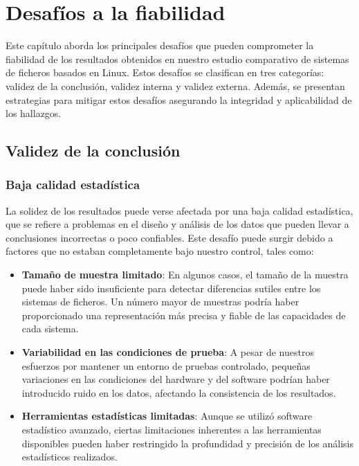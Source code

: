 \chapter{Desafíos a la fiabilidad}

Este capítulo aborda los principales desafíos que pueden comprometer la fiabilidad de los resultados obtenidos en nuestro estudio comparativo de sistemas de ficheros basados en Linux. Estos desafíos se clasifican en tres categorías: validez de la conclusión, validez interna y validez externa. Además, se presentan estrategias para mitigar estos desafíos asegurando la integridad y aplicabilidad de los hallazgos.

\section{Validez de la conclusión}

\subsection{Baja calidad estadística}

La solidez de los resultados puede verse afectada por una baja calidad estadística, que se refiere a problemas en el diseño y análisis de los datos que pueden llevar a conclusiones incorrectas o poco confiables. Este desafío puede surgir debido a factores que no estaban completamente bajo nuestro control, tales como:

\begin{itemize}
    \item \textbf{Tamaño de muestra limitado}: En algunos casos, el tamaño de la muestra puede haber sido insuficiente para detectar diferencias sutiles entre los sistemas de ficheros. Un número mayor de muestras podría haber proporcionado una representación más precisa y fiable de las capacidades de cada sistema.
    \item \textbf{Variabilidad en las condiciones de prueba}: A pesar de nuestros esfuerzos por mantener un entorno de pruebas controlado, pequeñas variaciones en las condiciones del hardware y del software podrían haber introducido ruido en los datos, afectando la consistencia de los resultados.
    \item \textbf{Herramientas estadísticas limitadas}: Aunque se utilizó software estadístico avanzado, ciertas limitaciones inherentes a las herramientas disponibles pueden haber restringido la profundidad y precisión de los análisis estadísticos realizados.
\end{itemize}

